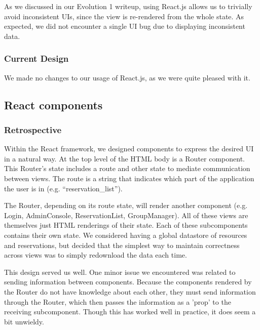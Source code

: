\documentclass[12pt]{article}
\begin{document}
As we discussed in our Evolution 1 writeup, using React.js allows us to trivially avoid inconsistent UIs, since the view is re-rendered from the whole state. As expected, we did not encounter a single UI bug due to displaying inconsistent data.

\subsubsection{Current Design}
We made no changes to our usage of React.js, as we were quite pleased with it.

\subsection{React components}
\subsubsection{Retrospective}
Within the React framework, we designed components to express the desired UI in a natural way. At the top level of the HTML body is a Router component. This Router's state includes a route and other state to mediate communication between views. The route is a string that indicates which part of the application the user is in (e.g. ``reservation\_list'').

The Router, depending on its route state, will render another component (e.g. Login, AdminConsole, ReservationList, GroupManager). All of these views are themselves just HTML renderings of their state. Each of these subcomponents contains their own state. We considered having a global datastore of resources and reservations, but decided that the simplest way to maintain correctness across views was to simply redownload the data each time.

This design served us well. One minor issue we encountered was related to sending information between components. Because the components rendered by the Router do not have knowledge about each other, they must send information through the Router, which then passes the information as a 'prop' to the receiving subcomponent. Though this has worked well in practice, it does seem a bit unwieldy.
\end{document}
